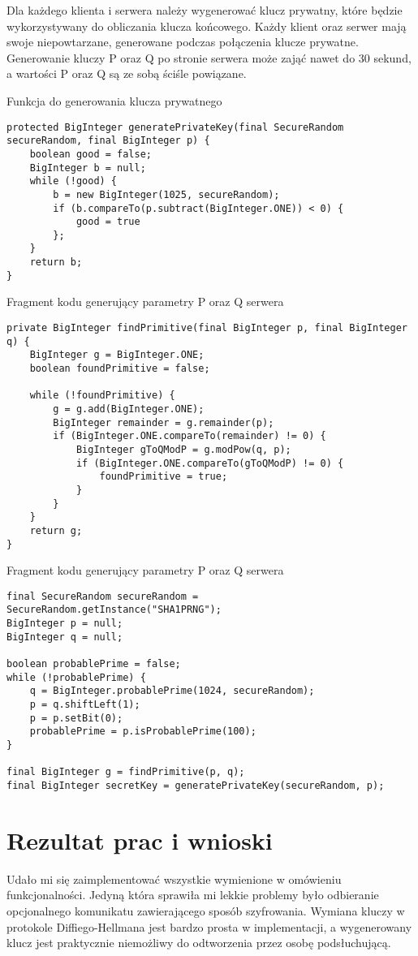 \documentclass[12pt,a4paper,titlepage]{article}
\begin{document}
Dla każdego klienta i serwera należy wygenerować klucz prywatny, które będzie wykorzystywany do obliczania klucza końcowego. Każdy klient oraz serwer mają swoje niepowtarzane, generowane podczas połączenia klucze prywatne. Generowanie kluczy P oraz Q po stronie serwera może zająć nawet do 30 sekund, a wartości P oraz Q są ze sobą ściśle powiązane.

\begin{listing}[H]
\caption{Funkcja do generowania klucza prywatnego}
\begin{verbatim}
protected BigInteger generatePrivateKey(final SecureRandom secureRandom, final BigInteger p) {
    boolean good = false;
    BigInteger b = null;
    while (!good) {
        b = new BigInteger(1025, secureRandom);
        if (b.compareTo(p.subtract(BigInteger.ONE)) < 0) {
            good = true
        };
    }
    return b;
}
\end{verbatim}
\end{listing}

\begin{listing}[H]
\caption{Fragment kodu generujący parametry P oraz Q serwera}
\begin{verbatim}
private BigInteger findPrimitive(final BigInteger p, final BigInteger q) {
    BigInteger g = BigInteger.ONE;
    boolean foundPrimitive = false;

    while (!foundPrimitive) {
        g = g.add(BigInteger.ONE);
        BigInteger remainder = g.remainder(p);
        if (BigInteger.ONE.compareTo(remainder) != 0) {
            BigInteger gToQModP = g.modPow(q, p);
            if (BigInteger.ONE.compareTo(gToQModP) != 0) {
                foundPrimitive = true;
            }
        }
    }
    return g;
}
\end{verbatim}
\end{listing}

\begin{listing}[H]
\caption{Fragment kodu generujący parametry P oraz Q serwera}
\begin{verbatim}
final SecureRandom secureRandom = SecureRandom.getInstance("SHA1PRNG");
BigInteger p = null;
BigInteger q = null;

boolean probablePrime = false;
while (!probablePrime) {
    q = BigInteger.probablePrime(1024, secureRandom);
    p = q.shiftLeft(1);
    p = p.setBit(0);
    probablePrime = p.isProbablePrime(100);
}

final BigInteger g = findPrimitive(p, q);
final BigInteger secretKey = generatePrivateKey(secureRandom, p);
\end{verbatim}
\end{listing}

\section{Rezultat prac i wnioski}
Udało mi się zaimplementować wszystkie wymienione w omówieniu funkcjonalności. Jedyną która sprawiła mi lekkie problemy było odbieranie opcjonalnego komunikatu zawierającego sposób szyfrowania.
Wymiana kluczy w protokole Diffiego-Hellmana jest bardzo prosta w implementacji, a wygenerowany klucz jest praktycznie niemożliwy do odtworzenia przez osobę podsłuchującą.
\end{document}
